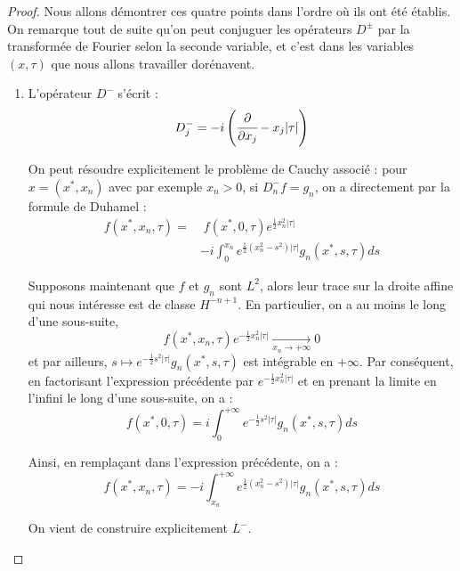 \begin{proof}
Nous allons démontrer ces quatre points dans l'ordre où ils ont été établis. On remarque tout de suite qu'on peut conjuguer les opérateurs $D^{\pm}$ par la transformée de Fourier selon la seconde variable, et c'est dans les variables $(x,\tau)$ que nous allons travailler dorénavent.

\begin{enumerate}
  \item L'opérateur $D^-$ s'écrit :
  \begin{equation*}
    D^-_j = -i\left(\cfrac{\partial}{\partial x_j} - x_j |\tau|\right)
  \end{equation*}
  
  On peut résoudre explicitement le problème de Cauchy associé : pour $x=(x^*,x_n)$ avec par exemple $x_n > 0$, si $D^-_nf = g_n$, on a directement par la formule de Duhamel :
  \begin{equation*}
  \begin{split}
    f(x^*,x_n,\tau)  = &\;f(x^*,0,\tau)e^{\frac12 x_n^2 |\tau|} \\ & -i \int_0^{x_n}e^{\frac 12 (x_n^2 - s^2)|\tau|}g_n(x^*,s,\tau)ds
    \end{split}
  \end{equation*}
  
  Supposons maintenant que $f$ et $g_n$ sont $L^2$, alors leur trace sur la droite affine qui nous intéresse est de classe $H^{-n+1}$. En particulier, on a au moins le long d'une sous-suite, 
  \begin{equation*}
    f(x^*, x_n,\tau)e^{-\frac 12 x_n^2 |\tau|} \underset{x_n \to +\infty}{\longrightarrow} 0
  \end{equation*}
  \noindent et par ailleurs, $s \mapsto e^{-\frac 12 s^2 |\tau|}g_n(x^*,s,\tau)$ est intégrable en $+\infty$. Par conséquent, en factorisant l'expression précédente par $e^{-\frac 12 x_n^2 |\tau|}$ et en prenant la limite en l'infini le long d'une sous-suite, on a :
  \begin{equation*}
    f(x^*,0,\tau) = i \int_0^{+\infty}e^{-\frac 12 s^2|\tau|}g_n(x^*,s,\tau)ds
  \end{equation*}
  
  Ainsi, en remplaçant dans l'expression précédente, on a :
  \begin{equation*}
    f(x^*,x_n,\tau)=  -i \int_{x_n}^{+\infty}e^{\frac 12 (x_n^2 - s^2)|\tau|}g_n(x^*,s,\tau)ds
  \end{equation*}
  
  On vient de construire explicitement $L^-$.
  

\end{enumerate}
\end{proof}
